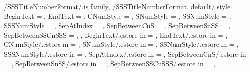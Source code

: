 \newcommand\GetSubSectionTitleNumberFormatString{}
\newcommand\SetupSubSectionTitleNumberFormatString
{%
  \SetupTitleNumberFormatString{SubSection}%
  {%
    BeginText=\GetSSTitleNumberFormatBeginText,%
    EndText=\GetSSTitleNumberFormatEndText,%
    CNumStyle=\GetSSTitleNumberFormatCNumStyle,%
    SNumStyle=\GetSSTitleNumberFormatSNumStyle,%
    SSNumStyle=\GetSSTitleNumberFormatSSNumStyle,%
    SepAtIndex=\GetSSTitleNumberFormatSepAtIndex,%
    SepBetweenCnS=\GetSSTitleNumberFormatSepBetweenCnS,%
    SepBetweenSnSS=\GetSSTitleNumberFormatSepBetweenSnSS,%
    CCounterName=chapter,%
    SCounterName=section,%
    SSCounterName=subsection,%
  }{\GetSubSectionTitleNumberFormatString}%
} %


\pgfkeys
{
  /SSSTitleNumberFormat/.is family, /SSSTitleNumberFormat,
  default/.style =
  {
    BeginText = \empty,
    EndText = \empty,
    CNumStyle = \empty,
    SNumStyle = \empty,
    SSNumStyle = \empty,
    SSSNumStyle = \empty,
    SepAtIndex = \empty, %
    SepBetweenCnS = \empty, %
    SepBetweenSnSS = \empty, %
    SepBetweenSSCnSSS = \empty, %
  },
  BeginText/.estore in = \GetSSSTitleNumberFormatBeginText,
  EndText/.estore in = \GetSSSTitleNumberFormatEndText,
  CNumStyle/.estore in = \GetSSSTitleNumberFormatCNumStyle,
  SNumStyle/.estore in = \GetSSSTitleNumberFormatSNumStyle,
  SSNumStyle/.estore in = \GetSSSTitleNumberFormatSSNumStyle,
  SSSNumStyle/.estore in = \GetSSSTitleNumberFormatSSSNumStyle,
  SepAtIndex/.estore in = \GetSSSTitleNumberFormatSepAtIndex,
  SepBetweenCnS/.estore in = \GetSSSTitleNumberFormatSepBetweenCnS,
  SepBetweenSnSS/.estore in = \GetSSSTitleNumberFormatSepBetweenSnSS,
  SepBetweenSSCnSSS/.estore in = \GetSSSTitleNumberFormatSepBetweenSSCnSSS,
} %

\newcommand\GetSubSubSectionTitleNumberFormatString{}
\newcommand\SetupSubSubSectionTitleNumberFormatString
{%
  \SetupTitleNumberFormatString{SubSubSection}%
  {%
    BeginText=\GetSSSTitleNumberFormatBeginText,%
    EndText=\GetSSSTitleNumberFormatEndText,%
    CNumStyle=\GetSSSTitleNumberFormatCNumStyle,%
    SNumStyle=\GetSSSTitleNumberFormatSNumStyle,%
    SSNumStyle=\GetSSSTitleNumberFormatSSNumStyle,%
    SSSNumStyle=\GetSSSTitleNumberFormatSSSNumStyle,%
    SepAtIndex=\GetSSSTitleNumberFormatSepAtIndex,%
    SepBetweenCnS=\GetSSSTitleNumberFormatSepBetweenCnS,%
    SepBetweenSnSS=\GetSSSTitleNumberFormatSepBetweenSnSS,%
    SepBetweenSSCnSSS=\GetSSSTitleNumberFormatSepBetweenSSCnSSS,%
    CCounterName=chapter,%
    SCounterName=section,%
    SSCounterName=subsection,%
    SSSCounterName=subsubsection,%
  }{\GetSubSubSectionTitleNumberFormatString}%
} %

